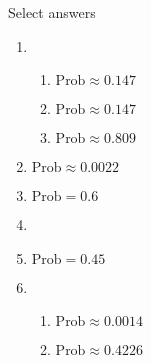 \documentclass{article}
\begin{document}
\newpage

Select answers\bigskip
\begin{enumerate}
    \item 
    \begin{enumerate}
        \item $\text{Prob} \approx 0.147$
        \item $\text{Prob} \approx 0.147$
        \item $\text{Prob} \approx 0.809$
    \end{enumerate}
    
    \item $\text{Prob} \approx 0.0022$
    
    \item $\text{Prob} = 0.6$
    
    \item 
    
    \item $\text{Prob} = 0.45$
    
    \item 
    \begin{enumerate}
        \item $\text{Prob} \approx 0.0014$
        \item $\text{Prob} \approx 0.4226$
    \end{enumerate}
\end{enumerate}
\end{document}
